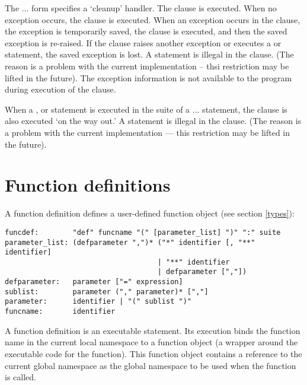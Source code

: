The ... form specifies a `cleanup' handler.  The
 clause is executed.  When no exception occurs, the
 clause is executed.  When an exception occurs in the
 clause, the exception is temporarily saved, the
 clause is executed, and then the saved exception is
re-raised.  If the  clause raises another exception or
executes a  or  statement, the saved
exception is lost.  A  statement is illegal in the
 clause.  (The reason is a problem with the current
implementation -- thsi restriction may be lifted in the future).  The
exception information is not available to the program during execution of
the  clause.

When a ,  or  statement is
executed in the  suite of a ...
statement, the  clause is also executed `on the way out.' A
 statement is illegal in the  clause.
(The reason is a problem with the current implementation --- this
restriction may be lifted in the future).

\section{Function definitions\label{function}}

A function definition defines a user-defined function object (see
section \ref{types}):

\begin{verbatim}
funcdef:        "def" funcname "(" [parameter_list] ")" ":" suite
parameter_list: (defparameter ",")* ("*" identifier [, "**" identifier] 
                                    | "**" identifier 
                                    | defparameter [","])
defparameter:   parameter ["=" expression]
sublist:        parameter ("," parameter)* [","]
parameter:      identifier | "(" sublist ")"
funcname:       identifier
\end{verbatim}

A function definition is an executable statement.  Its execution binds
the function name in the current local namespace to a function object
(a wrapper around the executable code for the function).  This
function object contains a reference to the current global namespace
as the global namespace to be used when the function is called.

